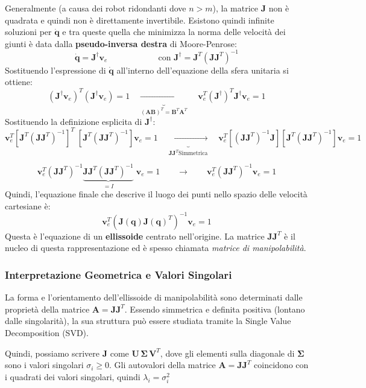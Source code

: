 ﻿\documentclass[11pt, a4paper]{article}
\begin{document}
Generalmente (a causa dei robot ridondanti dove $n > m$), la matrice $\bm{J}$ non è quadrata e quindi non è direttamente invertibile. Esistono quindi infinite soluzioni per $\dot{\bm{q}}$ e tra queste quella che minimizza la norma delle velocità dei giunti è data dalla \textbf{pseudo-inversa destra} di Moore-Penrose:
\[
    \dot{\bm{q}} = \bm{J}^\dagger \bm{v}_e \qquad \qquad \qquad \text{con } \bm{J}^\dagger = \bm{J}^T (\bm{J}\bm{J}^T)^{-1}
\]
Sostituendo l'espressione di $\dot{\bm{q}}$ all'interno dell'equazione della sfera unitaria si ottiene:
\[
    (\bm{J}^\dagger \bm{v}_e)^T (\bm{J}^\dagger \bm{v}_e) = 1 \quad\underbrace{\quad \longrightarrow \quad}_{(\bm{A}\bm{B})^T = \bm{B}^T\bm{A}^T} \quad \bm{v}_e^T (\bm{J}^\dagger)^T \bm{J}^\dagger \bm{v}_e = 1
\]
Sostituendo la definizione esplicita di $\bm{J}^\dagger$:
\[
    \bm{v}_e^T \left[ \bm{J}^T (\bm{J}\bm{J}^T)^{-1} \right]^{T} \; \left[ \bm{J}^T (\bm{J}\bm{J}^T)^{-1} \right] \bm{v}_e = 1 \quad\underbrace{\quad \longrightarrow \quad}_{\bm{J}\bm{J}^T \text{Simmetrica}} \quad \bm{v}_e^T \left[ (\bm{J}\bm{J}^T)^{-1}\bm{J} \right] \left[ \bm{J}^T (\bm{J}\bm{J}^T)^{-1} \right] \bm{v}_e = 1
\]

\[
    \bm{v}_e^T (\bm{J}\bm{J}^T)^{-1} \underbrace{\bm{J} \bm{J}^T (\bm{J}\bm{J}^T)^{-1}}_{= I} \; \bm{v}_e = 1 \qquad \longrightarrow \qquad \bm{v}_e^T (\bm{J}\bm{J}^T)^{-1} \bm{v}_e = 1
\]
Quindi, l'equazione finale che descrive il luogo dei punti nello spazio delle velocità cartesiane è:
\[
    \bm{v}_e^T \left( \bm{J}(\bm{q})\bm{J}(\bm{q})^T \right)^{-1} \bm{v}_e = 1
\]
Questa è l'equazione di un \textbf{ellissoide} centrato nell'origine. La matrice $\bm{J}\bm{J}^T$ è il nucleo di questa rappresentazione ed è spesso chiamata \emph{matrice di manipolabilità}.

\subsubsection{Interpretazione Geometrica e Valori Singolari}
La forma e l'orientamento dell'ellissoide di manipolabilità sono determinati dalle proprietà della matrice \(\mathbf{A} = \mathbf{J}\mathbf{J}^T\). Essendo simmetrica e definita positiva (lontano dalle singolarità), la sua struttura può essere studiata tramite la Single Value Decomposition (SVD).

Quindi, possiamo scrivere \(\mathbf{J} \) come \(\mathbf{U}\,\mathbf{\Sigma}\,\mathbf{V}^T\), dove gli elementi sulla diagonale  di \(\mathbf{\Sigma}\) sono i valori singolari \(\sigma_i \ge 0\). Gli autovalori della matrice \(\mathbf{A} = \mathbf{J}\mathbf{J}^T\) coincidono con i quadrati dei valori singolari, quindi \(\lambda_i = \sigma_i^2\)
\end{document}
